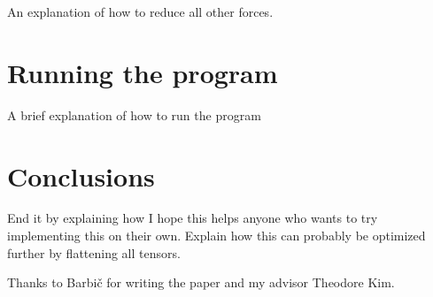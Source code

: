 \documentclass[twocolumn,10pt]{asme2ej}
\begin{document}
An explanation of how to reduce all other forces.

\section{Running the program}

A brief explanation of how to run the program

\section{Conclusions}

End it by explaining how I hope this helps anyone who wants to try implementing this on their own.
Explain how this can probably be optimized further by flattening all tensors.

\begin{acknowledgment}

Thanks to Barbič for writing the paper and my advisor Theodore Kim.

\end{acknowledgment}


%
\end{document}
